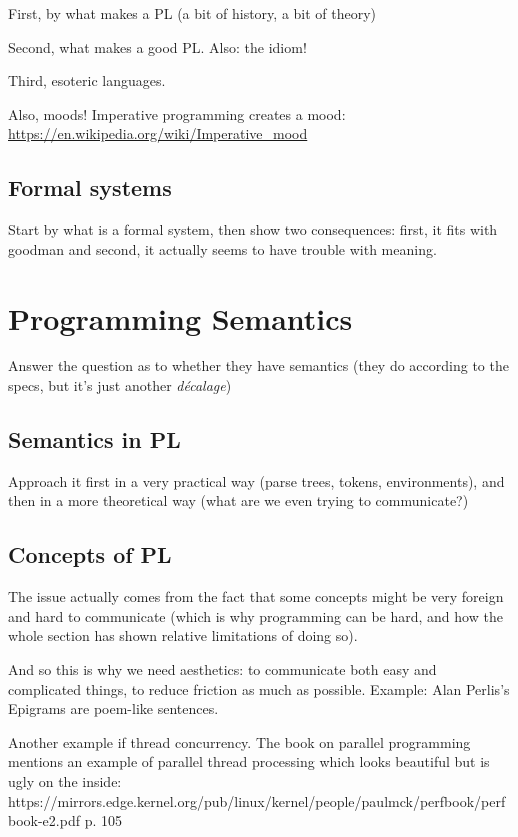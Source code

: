 \documentclass{article}
\begin{document}
First, by what makes a PL (a bit of history, a bit of theory)

Second, what makes a good PL. Also: the idiom!

Third, esoteric languages.

Also, moods! Imperative programming creates a mood: \url{https://en.wikipedia.org/wiki/Imperative_mood}

\subsection{Formal systems}

Start by what is a formal system, then show two consequences: first, it fits with goodman and second, it actually seems to have trouble with meaning.

\section{Programming Semantics}

Answer the question as to whether they have semantics (they do according to the specs, but it's just another \emph{décalage})

\subsection{Semantics in PL}

Approach it first in a very practical way (parse trees, tokens, environments), and then in a more theoretical way (what are we even trying to communicate?)

\subsection{Concepts of PL}

The issue actually comes from the fact that some concepts might be very foreign and hard to communicate (which is why programming can be hard, and how the whole section has shown relative limitations of doing so).

And so this is why we need aesthetics: to communicate both easy and complicated things, to reduce friction as much as possible. Example: Alan Perlis's Epigrams are poem-like sentences.

Another example if thread concurrency. The book on parallel programming mentions an example of parallel thread processing which looks beautiful but is ugly on the inside: https://mirrors.edge.kernel.org/pub/linux/kernel/people/paulmck/perfbook/perfbook-e2.pdf p. 105
\end{document}
